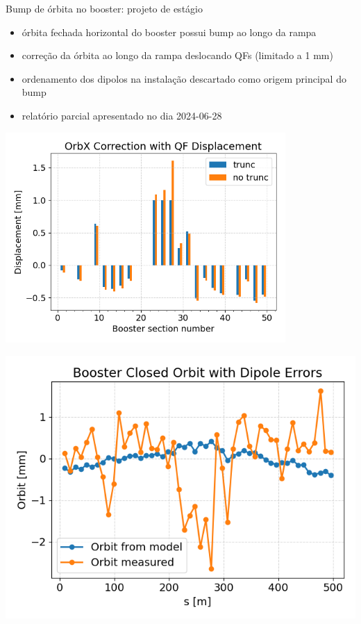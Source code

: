 
\begin{frame}{Bump de órbita no booster: projeto de estágio}

{\footnotesize
\begin{itemize}
    \item órbita fechada horizontal do booster possui bump ao longo da rampa
    \item correção da órbita ao longo da rampa deslocando QFs (limitado a 1 mm)
    \item ordenamento dos dipolos na instalação descartado como origem principal do bump
    \item relatório parcial apresentado no dia 2024-06-28 \href{https://cnpemcamp.sharepoint.com/:b:/s/FAC/EXHX-vKXStlBipKibZKZwh0BrcXlnEde5HUisWytbQWBog?e=5sYyjp}{}
\end{itemize}
}
\vspace{0.5cm}
\begin{minipage}{0.49\textwidth}
    \centering
    \includegraphics[width=0.8\textwidth]{2024-07-12/figures/qf_displacement_limit.png}
\end{minipage}
\begin{minipage}{0.49\textwidth}
    \centering
    \includegraphics[width=0.8\linewidth]{2024-07-12/figures/orbitx_dipoles_errors.png}
\end{minipage}%
\end{frame}


